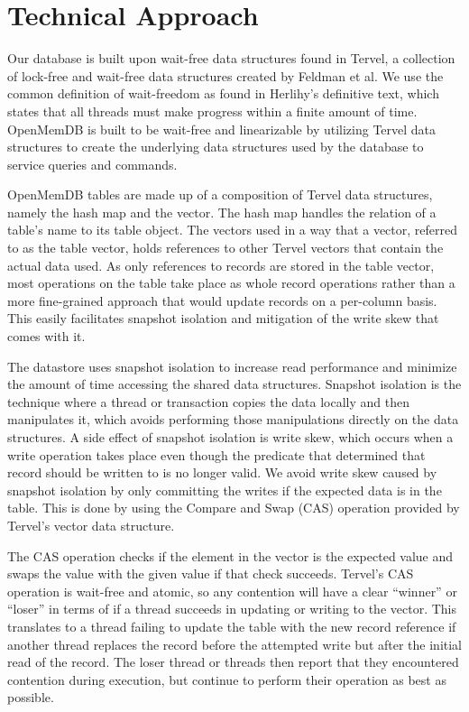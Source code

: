 \documentclass[conference, compsoc]{IEEEtran}
\begin{document}
\section{Technical Approach}
Our database is built upon wait-free data structures found in Tervel, a collection of
lock-free and wait-free data structures created by Feldman et al\cite{tervel:hazard_pointer}\cite{tervel:hash_map}\cite{tervel:vector}. 
We use the common definition of wait-freedom as found in Herlihy's definitive text, which
states that all threads must make progress within a finite amount of time\cite{herlihy:waitfree}. OpenMemDB is 
built to be wait-free and linearizable by utilizing Tervel data structures to create the 
underlying data structures used by the database to service queries and commands.
\par\vspace{\baselineskip}
OpenMemDB tables are made up of a composition of Tervel data structures, namely the hash map and the
vector. The hash map handles the relation of a table's name to its table object. The vectors used in a
way that a vector, referred to as the table vector, holds references to other Tervel vectors that contain
the actual data used. As only references to records are stored in the table vector, most operations on the
table take place as whole record operations rather than a more fine-grained approach that would update
records on a per-column basis. This easily facilitates snapshot isolation and mitigation of the write skew
that comes with it.
\par\vspace{\baselineskip}
The datastore uses snapshot isolation to increase read performance and minimize the amount of time accessing
the shared data structures. Snapshot isolation is the technique where a thread or transaction copies the data
locally and then manipulates it, which avoids performing those manipulations directly on the data structures.
A side effect of snapshot isolation is write skew, which occurs when a write operation takes place even though the
predicate that determined that record should be written to is no longer valid.
We avoid write skew caused by snapshot isolation by only committing the writes
if the expected data is in the table. This is done by using the Compare and Swap (CAS) operation provided
by Tervel's vector data structure. 
\par\vspace{\baselineskip}
The CAS operation checks if the element in the vector is the
expected value and swaps the value with the given value if that check succeeds. Tervel's CAS
operation is wait-free and atomic, so any contention will have a clear ``winner'' or ``loser'' in terms
of if a thread succeeds in updating or writing to the vector. This translates to a thread failing to update the
table with the new record reference if another thread replaces the record before the attempted write but 
after the initial read of the record.  The loser thread or threads then report that they encountered 
contention during execution, but continue to perform their operation as best as possible.
\end{document}
